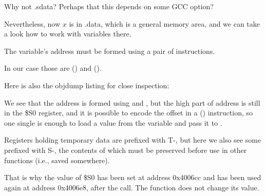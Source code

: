Why not .sdata? Perhaps that this depends on some GCC option?

Nevertheless, now $x$ is in .data, which is a general memory area, and we can take a look
how to work with variables there.


The variable's address must be formed using a pair of instructions.

In our case those are  () and  ().

Here is also the objdump listing for close inspection:




We see that the address is formed using  and , but the high part of address is still in
the \$S0 register, and it is possible to encode the offset in a  () instruction, so one single  is enough 
to load a value from the variable and pass it to \printf.

Registers holding temporary data are prefixed with T-, but here we also see some prefixed with S-, 
the contents of which must be preserved before use in other functions (i.e., saved somewhere).

That is why the value of \$S0 has been set at address 0x4006cc and has been used again
at address 0x4006e8, after the \scanf call. 
The \scanf function does not change its value.

